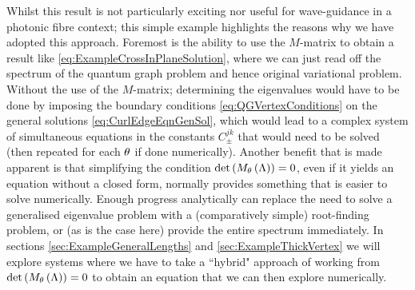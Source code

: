 Whilst this result is not particularly exciting nor useful for wave-guidance in a photonic fibre context; this simple example highlights the reasons why we have adopted this approach.
Foremost is the ability to use the $M$-matrix to obtain a result like \eqref{eq:ExampleCrossInPlaneSolution}, where we can just read off the spectrum of the quantum graph problem and hence original variational problem.
Without the use of the $M$-matrix; determining the eigenvalues would have to be done by imposing the boundary conditions \eqref{eq:QGVertexConditions} on the general solutions \eqref{eq:CurlEdgeEqnGenSol}, which would lead to a complex system of simultaneous equations in the constants $C_{\pm}^{jk}$ that would need to be solved (then repeated for each $\theta$ if done numerically).
Another benefit that is made apparent is that simplifying the condition $\det\left( M_{\theta}\left( \Lambda \right) \right) = 0$, even if it yields an equation without a closed form, normally provides something that is easier to solve numerically.
Enough progress analytically can replace the need to solve a generalised eigenvalue problem with a (comparatively simple) root-finding problem, or (as is the case here) provide the entire spectrum immediately.
In sections \ref{sec:ExampleGeneralLengths} and \ref{sec:ExampleThickVertex} we will explore systems where we have to take a ``hybrid" approach of working from $\det\left( M_{\theta}\left( \Lambda \right) \right) = 0$ to obtain an equation that we can then explore numerically.

